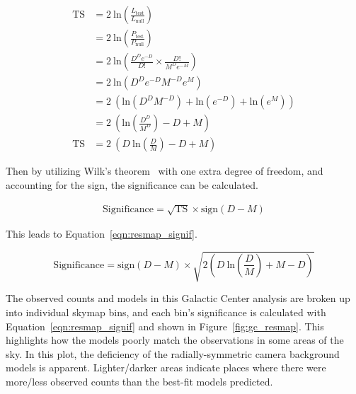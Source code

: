   \begin{equation}
    \begin{split}
      \textrm{TS} & = 2 \: \textrm{ln} \left ( \frac{ L_{\textrm{test}} }{ L_{\textrm{null}}    } \right ) \\
                  & = 2 \: \textrm{ln} \left ( \frac{ P_{\textrm{test}} }{ P_{\textrm{null}}    } \right ) \\
                  & = 2 \: \textrm{ln} \left ( \frac{D^D e^{-D}}{D!} \times \frac{D!}{M^D e^{-M}} \right ) \\
                  & = 2 \: \textrm{ln} \left ( D^D e^{-D} M^{-D} e^M                              \right ) \\
                  & = 2 \: \left (      \textrm{ln} \left ( D^D M^{-D} \right ) + \textrm{ln} \left ( e^{-D} \right ) + \textrm{ln} \left ( e^M  \right )\right ) \\
                  & = 2 \: \left (      \textrm{ln} \left (  \frac{D^D}{M^D} \right ) -D + M \right ) \\
      \textrm{TS} & = 2 \: \left ( D \: \textrm{ln} \left (  \frac{D  }{M  } \right ) -D + M \right )
    \end{split}
  \end{equation}
  
  Then by utilizing Wilk's theorem~\cite{wilks1938} with one extra degree of freedom, and accounting for the sign, the significance can be calculated.
    
  \begin{equation}
    \begin{split}
      \textrm{Significance} = \sqrt{\textrm{TS}} \times \textrm{sign} \left ( D - M \right )
    \end{split}
  \end{equation}
  
  This leads to Equation~\ref{eqn:resmap_signif}.
  
  \begin{equation}\label{eqn:resmap_signif}
    \textrm{Significance} = \textrm{sign}(D-M) \times \sqrt{ 2 \left ( D \: \textrm{ln} \left ( \frac{D}{M} \right ) + M - D \right ) }
  \end{equation}

  The observed counts and models in this Galactic Center analysis are broken up into individual skymap bins, and each bin's significance is calculated with Equation~\ref{eqn:resmap_signif} and shown in Figure~\ref{fig:gc_resmap}.
  This highlights how the models poorly match the observations in some areas of the sky.
  In this plot, the deficiency of the radially-symmetric camera background models is apparent.
  Lighter/darker areas indicate places where there were more/less observed counts than the best-fit models predicted.
  
